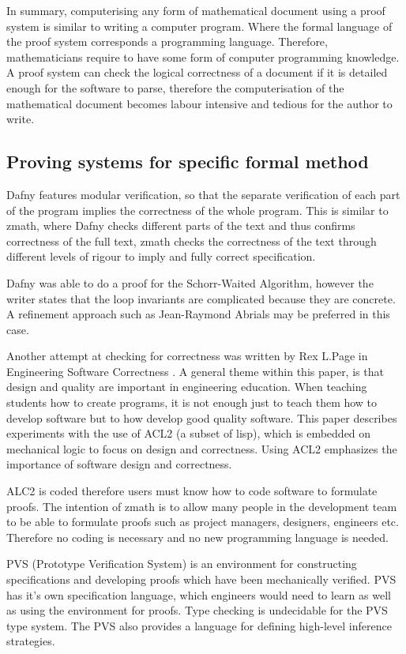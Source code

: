In summary, computerising any form of mathematical document using a proof
system is similar to writing a computer program. Where the formal language of
the proof system corresponds a programming language. Therefore, mathematicians
require to have some form of computer programming knowledge. A proof system can
check the logical correctness of a document if it is detailed enough for the
software to parse, therefore the computerisation of the mathematical document
becomes labour intensive and tedious for the author to write.

\subsection{Proving systems for specific formal method}


Dafny \cite{dafny} features modular verification, so that the separate
verification of each part of the program implies the correctness of the whole
program. This is similar to \gls{zmath}, where Dafny checks different parts of
the text and thus confirms correctness of the full text, \gls{zmath} checks the
correctness of the text through different levels of rigour to imply and fully
correct specification.

Dafny was able to do a proof for the Schorr-Waited Algorithm, however the writer
states that the loop invariants are complicated because they are concrete. A
refinement approach such as Jean-Raymond Abrials \cite{abrial} may be preferred
in this case.  

Another attempt at checking for correctness was written by Rex L.Page in
Engineering Software Correctness \cite{engineeringsoftwarecorrectness}. A
general theme within this paper, is that design and quality are important in
engineering education. When teaching students how to create programs, it is not
enough just to teach them how to develop software but to how develop good
quality software. This paper describes experiments with the use of ACL2 (a
subset of lisp), which is embedded on mechanical logic to focus on design and
correctness. Using ACL2 emphasizes the importance of software design and
correctness. 

ALC2 is coded therefore users must know how to code software to formulate
proofs. The intention of \gls{zmath} is to allow many people in the development
team to be able to formulate proofs such as project managers, designers,
engineers etc. Therefore no coding is necessary and no new programming language
is needed.

PVS (Prototype Verification System) \cite{pvs} is an environment for
constructing specifications and developing proofs which have been mechanically
verified. PVS has it's own specification language, which engineers would need to
learn as well as using the environment for proofs. Type checking is undecidable
for the PVS type system. The PVS also provides a language for defining
high-level inference strategies.


